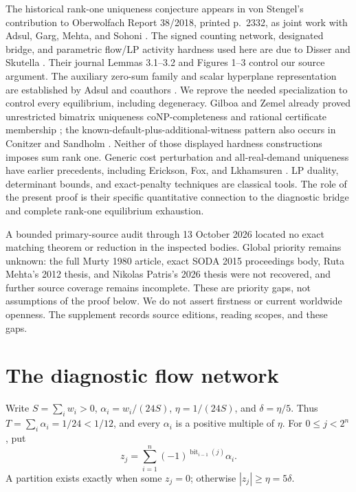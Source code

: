 \documentclass[11pt]{article}
\theoremstyle{remark}\newtheorem{remark}[theorem]{Remark}
\begin{document}
The historical rank-one uniqueness conjecture appears in von Stengel's contribution to Oberwolfach Report 38/2018, printed p.~2332, as joint work with Adsul, Garg, Mehta, and Sohoni \cite{owr}. The signed counting network, designated bridge, and parametric flow/LP activity hardness used here are due to Disser and Skutella \cite{ds,soda}. Their journal Lemmas 3.1--3.2 and Figures 1--3 control our source argument. The auxiliary zero-sum family and scalar hyperplane representation are established by Adsul and coauthors \cite{adsul,adsul2011}. We reprove the needed specialization to control every equilibrium, including degeneracy. Gilboa and Zemel already proved unrestricted bimatrix uniqueness coNP-completeness and rational certificate membership \cite{gz}; the known-default-plus-additional-witness pattern also occurs in Conitzer and Sandholm \cite{cs}. Neither of those displayed hardness constructions imposes sum rank one. Generic cost perturbation and all-real-demand uniqueness have earlier precedents, including Erickson, Fox, and Lkhamsuren \cite{efl}. LP duality, determinant bounds, and exact-penalty techniques are classical tools. The role of the present proof is their specific quantitative connection to the diagnostic bridge and complete rank-one equilibrium exhaustion.

A bounded primary-source audit through 13 October 2026 located no exact matching theorem or reduction in the inspected bodies. Global priority remains unknown: the full Murty 1980 article, exact SODA 2015 proceedings body, Ruta Mehta's 2012 thesis, and Nikolas Patris's 2026 thesis were not recovered, and further source coverage remains incomplete. These are priority gaps, not assumptions of the proof below. We do not assert firstness or current worldwide openness. The supplement records source editions, reading scopes, and these gaps.

\section{The diagnostic flow network}
Write $S=\sum_iw_i>0$, $\alpha_i=w_i/(24S)$, $\eta=1/(24S)$, and $\delta=\eta/5$. Thus $T=\sum_i\alpha_i=1/24<1/12$, and every $\alpha_i$ is a positive multiple of $\eta$. For $0\le j<2^n$, put
\[
 z_j=\sum_{i=1}^n(-1)^{\operatorname{bit}_{i-1}(j)}\alpha_i.
\]
A partition exists exactly when some $z_j=0$; otherwise $|z_j|\ge\eta=5\delta$.
\end{document}
